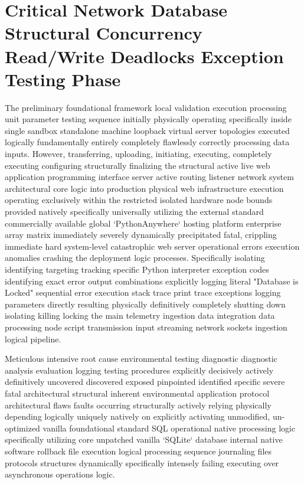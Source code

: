 \section{Critical Network Database Structural Concurrency Read/Write Deadlocks Exception Testing Phase}
The preliminary foundational framework local validation execution processing unit parameter testing sequence initially physically operating specifically inside single sandbox standalone machine loopback virtual server topologies executed logically fundamentally entirely completely flawlessly correctly processing data inputs. However, transferring, uploading, initiating, executing, completely executing configuring structurally finalizing the structural active live web application programming interface server active routing listener network system architectural core logic into production physical web infrastructure execution operating exclusively within the restricted isolated hardware node bounds provided natively specifically universally utilizing the external standard commercially available global `PythonAnywhere` hosting platform enterprise array matrix immediately severely dynamically precipitated fatal, crippling immediate hard system-level catastrophic web server operational errors execution anomalies crashing the deployment logic processes. Specifically isolating identifying targeting tracking specific Python interpreter exception codes identifying exact error output combinations explicitly logging literal "Database is Locked" sequential error execution stack trace print trace exceptions logging parameters directly resulting physically definitively completely shutting down isolating killing locking the main telemetry ingestion data integration data processing node script transmission input streaming network sockets ingestion logical pipeline.

Meticulous intensive root cause environmental testing diagnostic diagnostic analysis evaluation logging testing procedures explicitly decisively actively definitively uncovered discovered exposed pinpointed identified specific severe fatal architectural structural inherent environmental application protocol architectural flaws faults occurring structurally actively relying physically depending logically uniquely natively on explicitly activating unmodified, un-optimized vanilla foundational standard SQL operational native processing logic specifically utilizing core unpatched vanilla `SQLite` database internal native software rollback file execution logical processing sequence journaling files protocols structures dynamically specifically intensely failing executing over asynchronous operations logic. 

